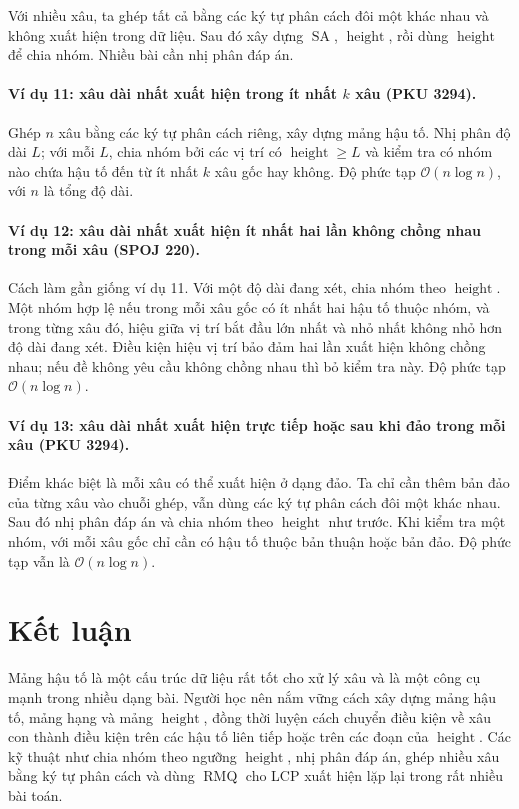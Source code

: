 \documentclass[11pt]{article}
\newcommand{\Oh}{\mathcal{O}}
\newcommand{\SA}{\operatorname{SA}}
\newcommand{\Height}{\operatorname{height}}
\newcommand{\RMQ}{\operatorname{RMQ}}
\begin{document}
Với nhiều xâu, ta ghép tất cả bằng các ký tự phân cách đôi một khác nhau và
không xuất hiện trong dữ liệu. Sau đó xây dựng \(\SA\), \(\Height\), rồi dùng
\(\Height\) để chia nhóm. Nhiều bài cần nhị phân đáp án.

\paragraph{Ví dụ 11: xâu dài nhất xuất hiện trong ít nhất \(k\) xâu (PKU
3294).}
Ghép \(n\) xâu bằng các ký tự phân cách riêng, xây dựng mảng hậu tố. Nhị phân
độ dài \(L\); với mỗi \(L\), chia nhóm bởi các vị trí có \(\Height\ge L\) và
kiểm tra có nhóm nào chứa hậu tố đến từ ít nhất \(k\) xâu gốc hay không. Độ
phức tạp \(\Oh(n\log n)\), với \(n\) là tổng độ dài.

\paragraph{Ví dụ 12: xâu dài nhất xuất hiện ít nhất hai lần không chồng nhau
trong mỗi xâu (SPOJ 220).}
Cách làm gần giống ví dụ 11. Với một độ dài đang xét, chia nhóm theo
\(\Height\). Một nhóm hợp lệ nếu trong mỗi xâu gốc có ít nhất hai hậu tố thuộc
nhóm, và trong từng xâu đó, hiệu giữa vị trí bắt đầu lớn nhất và nhỏ nhất
không nhỏ hơn độ dài đang xét. Điều kiện hiệu vị trí bảo đảm hai lần xuất
hiện không chồng nhau; nếu đề không yêu cầu không chồng nhau thì bỏ kiểm tra
này. Độ phức tạp \(\Oh(n\log n)\).

\paragraph{Ví dụ 13: xâu dài nhất xuất hiện trực tiếp hoặc sau khi đảo trong
mỗi xâu (PKU 3294).}
Điểm khác biệt là mỗi xâu có thể xuất hiện ở dạng đảo. Ta chỉ cần thêm bản
đảo của từng xâu vào chuỗi ghép, vẫn dùng các ký tự phân cách đôi một khác
nhau. Sau đó nhị phân đáp án và chia nhóm theo \(\Height\) như trước. Khi
kiểm tra một nhóm, với mỗi xâu gốc chỉ cần có hậu tố thuộc bản thuận hoặc bản
đảo. Độ phức tạp vẫn là \(\Oh(n\log n)\).

\section{Kết luận}

Mảng hậu tố là một cấu trúc dữ liệu rất tốt cho xử lý xâu và là một công cụ
mạnh trong nhiều dạng bài. Người học nên nắm vững cách xây dựng mảng hậu tố,
mảng hạng và mảng \(\Height\), đồng thời luyện cách chuyển điều kiện về xâu
con thành điều kiện trên các hậu tố liên tiếp hoặc trên các đoạn của
\(\Height\). Các kỹ thuật như chia nhóm theo ngưỡng \(\Height\), nhị phân đáp
án, ghép nhiều xâu bằng ký tự phân cách và dùng \(\RMQ\) cho LCP xuất hiện
lặp lại trong rất nhiều bài toán.
\end{document}
